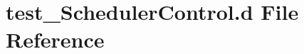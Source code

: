 \hypertarget{test___scheduler_control_8d}{}\section{test\+\_\+\+Scheduler\+Control.\+d File Reference}
\label{test___scheduler_control_8d}
